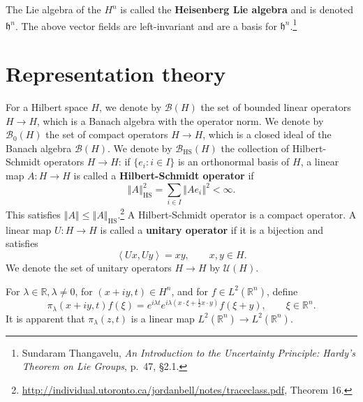 \documentclass{article}
\newcommand{\inner}[2]{\left\langle #1, #2 \right\rangle}
\newcommand{\norm}[1]{\left\Vert #1 \right\Vert}
\newcommand{\HS}[1]{\left\Vert #1 \right\Vert_{\mathrm{HS}}}
\theoremstyle{definition}
\begin{document}
The Lie algebra of the $H^n$ is called the \textbf{Heisenberg Lie algebra} and is denoted $\mathfrak{h}^n$.
The above vector fields are left-invariant and are a basis for $\mathfrak{h}^n$.\footnote{Sundaram Thangavelu,
{\em An Introduction to the Uncertainty Principle: Hardy's Theorem on Lie Groups}, p.~47, \S 2.1.}


\section{Representation theory}
For a Hilbert space $H$, we denote by $\mathscr{B}(H)$ the set of 
bounded linear operators $H \to H$, which  is a Banach algebra with the operator norm. We denote by $\mathscr{B}_0(H)$ the set
of
compact operators $H \to H$, which is a closed ideal of the Banach algebra $\mathscr{B}(H)$. 
We denote by $\mathscr{B}_{\mathrm{HS}}(H)$ the collection of Hilbert-Schmidt operators $H \to H$: if $\{e_i: i \in I\}$ is an orthonormal basis
of $H$, a linear map $A:H \to H$ is called a  \textbf{Hilbert-Schmidt operator} if
\[
\HS{A}^2 = \sum_{i \in I} \norm{Ae_i}^2 < \infty.
\]
This satisfies $\norm{A} \leq \HS{A}$.\footnote{\url{http://individual.utoronto.ca/jordanbell/notes/traceclass.pdf}, Theorem 16.}
A Hilbert-Schmidt operator is a compact operator.
A linear map $U:H \to H$ is called a \textbf{unitary operator} if it is a bijection and satisfies
\[
\inner{Ux}{Uy} = {x}{y},\qquad x,y \in H.
\]
We denote the
set of unitary operators $H \to H$ by $\mathscr{U}(H)$. 




For $\lambda \in \mathbb{R}, \lambda \neq 0$, for $(x+iy,t) \in H^n$, and for $f \in L^2(\mathbb{R}^n)$, define
\[
\pi_\lambda(x+iy,t)f(\xi) = e^{i\lambda t} e^{i\lambda\left(x\cdot \xi+\frac{1}{2}x\cdot y\right)} f(\xi+y),
\qquad \xi \in \mathbb{R}^n.
\]
It is apparent that $\pi_\lambda(z,t)$ is a linear map $L^2(\mathbb{R}^n) \to L^2(\mathbb{R}^n)$. 
\end{document}
